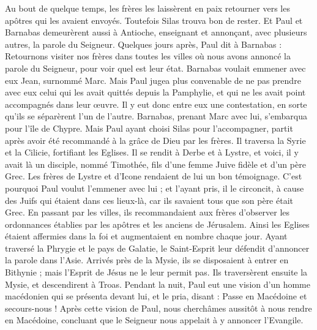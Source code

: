 \begin{multicols}{2}
Au bout de quelque temps, les frères les laissèrent en paix retourner vers les apôtres qui les avaient envoyés.
Toutefois Silas trouva bon de rester.
Et Paul et Barnabas demeurèrent aussi à Antioche, enseignant et annonçant, avec plusieurs autres, la parole du Seigneur.
Quelques jours après, Paul dit à Barnabas : Retournons visiter nos frères dans toutes les villes où nous avons annoncé la parole du Seigneur, pour voir quel est leur état.
Barnabas voulait emmener avec eux Jean, surnommé Marc.
Mais Paul jugea plus convenable de ne pas prendre avec eux celui qui les avait quittés depuis la Pamphylie, et qui ne les avait point accompagnés dans leur œuvre.
Il y eut donc entre eux une contestation, en sorte qu’ils se séparèrent l’un de l’autre. Barnabas, prenant Marc avec lui, s’embarqua pour l’île de Chypre.
Mais Paul ayant choisi Silas pour l'accompagner, partit après avoir été recommandé à la grâce de Dieu par les frères.
Il traversa la Syrie et la Cilicie, fortifiant les Eglises.
\VerseOne{}Il se rendit à Derbe et à Lystre, et voici, il y avait là un disciple, nommé Timothée, fils d'une femme Juive fidèle et d'un père Grec.
Les frères de Lystre et d’Icone rendaient de lui un bon témoignage.
C'est pourquoi Paul voulut l’emmener avec lui ; et l'ayant pris, il le circoncit, à cause des Juifs qui étaient dans ces lieux-là, car ils savaient tous que son père était Grec.
En passant par les villes, ils recommandaient aux frères d’observer les ordonnances établies par les apôtres et les anciens de Jérusalem.
Ainsi les Eglises étaient affermies dans la foi et augmentaient en nombre chaque jour.
Ayant traversé la Phrygie et le pays de Galatie, le Saint-Esprit leur défendit d'annoncer la parole dans l’Asie.
Arrivés près de la Mysie, ils se disposaient à entrer en Bithynie ; mais l'Esprit de Jésus ne le leur permit pas.
Ils traversèrent ensuite la Mysie, et descendirent à Troas.
Pendant la nuit, Paul eut une vision d’un homme macédonien qui se présenta devant lui, et le pria, disant : Passe en Macédoine et secours-nous !
Après cette vision de Paul, nous cherchâmes aussitôt à nous rendre en Macédoine, concluant que le Seigneur nous appelait à y annoncer l’Evangile.

\end{multicols}

